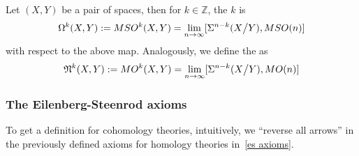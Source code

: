 \documentclass[a4paper,11pt]{article}
\begin{document}
\begin{definition}
    Let \((X,Y)\) be a pair of spaces, then for \(k\in\mathbb{Z}\), the \(k\) is
    \[\Omega^k(X,Y):=MSO^k(X,Y)=\lim_{n\to\infty}[\Sigma^{n-k}(X\big/Y),MSO(n)]\]
    with respect to the above map.
    Analogously, we define the  as
    \[\mathfrak{N}^k(X,Y):= MO^k(X,Y)=\lim_{n\to\infty}[\Sigma^{n-k}(X\big/ Y),MO(n)]\]
\end{definition}

\subsubsection{The Eilenberg-Steenrod axioms}
To get a definition for cohomology theories, intuitively, we \enquote{reverse all arrows} in the previously defined axioms for homology theories in\ \ref{es axioms}.
\end{document}
